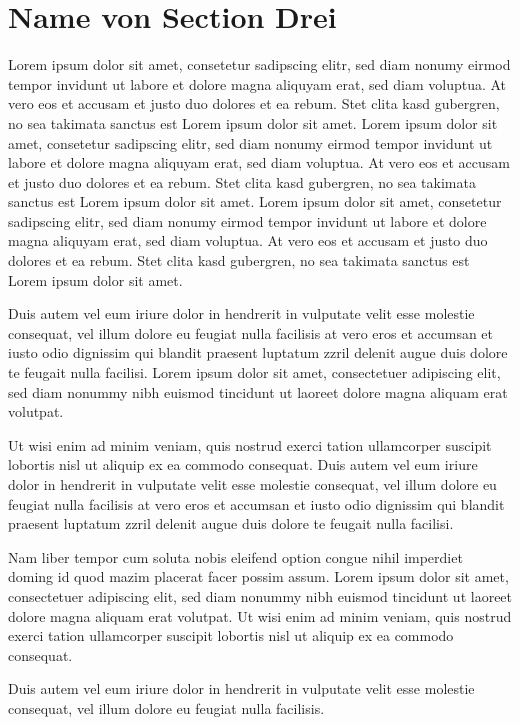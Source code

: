 \documentclass{article}
\begin{document}
\section{Name von Section Drei}
\label{sec:section_3}

Lorem ipsum dolor sit amet, consetetur sadipscing elitr, sed diam nonumy eirmod tempor invidunt ut labore et dolore magna aliquyam erat, sed diam voluptua. At vero eos et accusam et justo duo dolores et ea rebum. Stet clita kasd gubergren, no sea takimata sanctus est Lorem ipsum dolor sit amet. Lorem ipsum dolor sit amet, consetetur sadipscing elitr, sed diam nonumy eirmod tempor invidunt ut labore et dolore magna aliquyam erat, sed diam voluptua. At vero eos et accusam et justo duo dolores et ea rebum. Stet clita kasd gubergren, no sea takimata sanctus est Lorem ipsum dolor sit amet. Lorem ipsum dolor sit amet, consetetur sadipscing elitr, sed diam nonumy eirmod tempor invidunt ut labore et dolore magna aliquyam erat, sed diam voluptua. At vero eos et accusam et justo duo dolores et ea rebum. Stet clita kasd gubergren, no sea takimata sanctus est Lorem ipsum dolor sit amet.   

Duis autem vel eum iriure dolor in hendrerit in vulputate velit esse molestie consequat, vel illum dolore eu feugiat nulla facilisis at vero eros et accumsan et iusto odio dignissim qui blandit praesent luptatum zzril delenit augue duis dolore te feugait nulla facilisi. Lorem ipsum dolor sit amet, consectetuer adipiscing elit, sed diam nonummy nibh euismod tincidunt ut laoreet dolore magna aliquam erat volutpat.   

Ut wisi enim ad minim veniam, quis nostrud exerci tation ullamcorper suscipit lobortis nisl ut aliquip ex ea commodo consequat. Duis autem vel eum iriure dolor in hendrerit in vulputate velit esse molestie consequat, vel illum dolore eu feugiat nulla facilisis at vero eros et accumsan et iusto odio dignissim qui blandit praesent luptatum zzril delenit augue duis dolore te feugait nulla facilisi.   

Nam liber tempor cum soluta nobis eleifend option congue nihil imperdiet doming id quod mazim placerat facer possim assum. Lorem ipsum dolor sit amet, consectetuer adipiscing elit, sed diam nonummy nibh euismod tincidunt ut laoreet dolore magna aliquam erat volutpat. Ut wisi enim ad minim veniam, quis nostrud exerci tation ullamcorper suscipit lobortis nisl ut aliquip ex ea commodo consequat.   

Duis autem vel eum iriure dolor in hendrerit in vulputate velit esse molestie consequat, vel illum dolore eu feugiat nulla facilisis.   
\end{document}

